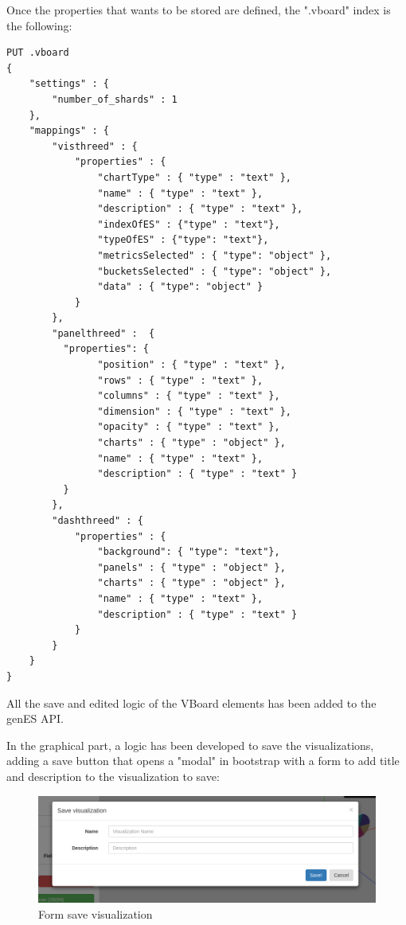 \documentclass[a4paper, 12pt]{book}
\begin{document}
Once the properties that wants to be stored are defined, the ".vboard" index is the following:

\begin{lstlisting}[frame=single]
PUT .vboard
{
    "settings" : {
        "number_of_shards" : 1
    },
    "mappings" : {
        "visthreed" : {
            "properties" : {
                "chartType" : { "type" : "text" },
                "name" : { "type" : "text" },
                "description" : { "type" : "text" },
                "indexOfES" : {"type" : "text"},
                "typeOfES" : {"type": "text"},
                "metricsSelected" : { "type": "object" },
                "bucketsSelected" : { "type": "object" },
                "data" : { "type": "object" }
            }
        },
        "panelthreed" :  {
          "properties": {
                "position" : { "type" : "text" },
                "rows" : { "type" : "text" },
                "columns" : { "type" : "text" },
                "dimension" : { "type" : "text" },
                "opacity" : { "type" : "text" },
                "charts" : { "type" : "object" },
                "name" : { "type" : "text" },
                "description" : { "type" : "text" }
          }
        },
        "dashthreed" : {
            "properties" : {
                "background": { "type": "text"},
                "panels" : { "type" : "object" },
                "charts" : { "type" : "object" },
                "name" : { "type" : "text" },
                "description" : { "type" : "text" }
            }
        }
    }
}
\end{lstlisting}

All the save and edited logic of the VBoard elements has been added to the genES API.

In the graphical part, a logic has been developed to save the visualizations, adding a save button that opens a "modal" in bootstrap with a form to add title and description to the visualization to save:

\begin{figure}[H]
  \centering
  \includegraphics[width=16cm, keepaspectratio]{img/development/examplesave}
  \caption{Form save visualization}
  \label{fig:examplesave}
\end{figure}
\end{document}
